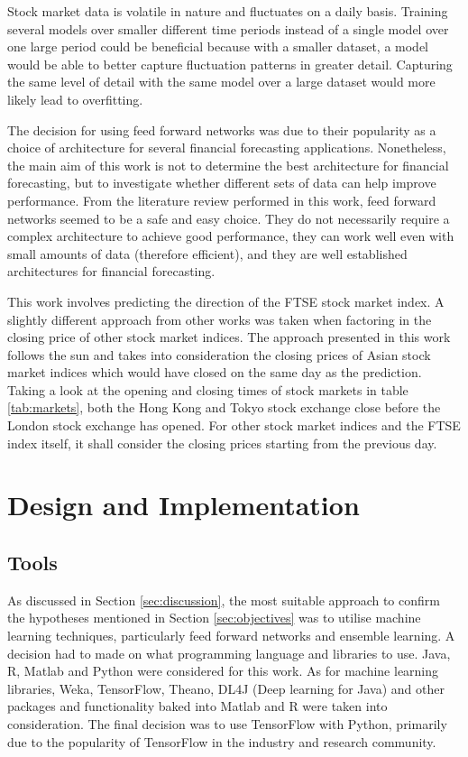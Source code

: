 \documentclass{UoYCSproject}
\begin{document}
Stock market data is volatile in nature and fluctuates on a daily basis. Training several models over smaller different time periods instead of a single model over one large period could be beneficial because with a smaller dataset, a model would be able to better capture fluctuation patterns in greater detail. Capturing the same level of detail with the same model over a large dataset would more likely lead to overfitting. 

The decision for using feed forward networks was due to their popularity as a choice of architecture for several financial forecasting applications. Nonetheless, the main aim of this work is not to determine the best architecture for financial forecasting, but to investigate whether different sets of data can help improve performance. From the literature review performed in this work, feed forward networks seemed to be a safe and easy choice. They do not necessarily require a complex architecture to achieve good performance, they can work well even with small amounts of data (therefore efficient), and they are well established architectures for financial forecasting.    

This work involves predicting the direction of the FTSE stock market index. A slightly different approach from other works was taken when factoring in the closing price of other stock market indices. The approach presented in this work follows the sun and takes into consideration the closing prices of Asian stock market indices which would have closed on the same day as the prediction. Taking a look at the opening and closing times of stock markets in table \ref{tab:markets}, both the Hong Kong and Tokyo stock exchange close before the London stock exchange has opened. For other stock market indices and the FTSE index itself, it shall consider the closing prices starting from the previous day.       

\chapter{Design and Implementation}
\label{cha:implementation}
\section{Tools}
As discussed in Section \ref{sec:discussion}, the most suitable approach to confirm the hypotheses mentioned in Section \ref{sec:objectives} was to utilise machine learning techniques, particularly feed forward networks and ensemble learning. A decision had to made on what programming language and libraries to use. Java, R, Matlab and Python were considered for this work. As for machine learning libraries, Weka, TensorFlow, Theano, DL4J (Deep learning for Java) and other packages and functionality baked into Matlab and R were taken into consideration. The final decision was to use TensorFlow with Python, primarily due to the popularity of TensorFlow in the industry and research community. 
\end{document}
